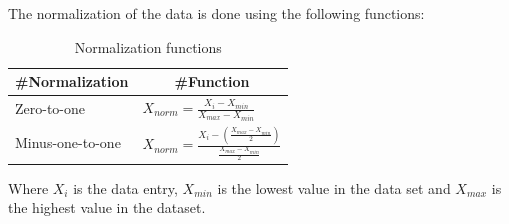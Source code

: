 The normalization of the data is done using the following functions:
\begin{table}[H]
\centering  %
\renewcommand{\arraystretch}{2}
\begin{tabular}{c c} %
 \#Normalization & \#Function \\ [0.5ex] %
\hline                  %
\multicolumn{1}{l}{Zero-to-one} & \multicolumn{1}{l}{$ X_{norm} = \frac{X_i - X_{min}}{X_{max} - X_{min}}$} \\
\multicolumn{1}{l}{Minus-one-to-one} & \multicolumn{1}{l}{$ X_{norm} = \frac{X_i - (\frac{X_{max} - X_{min}}{2})}{\frac{X_{max} - X_{min}}{2}}$} \\
[1ex]
\hline %
\end{tabular}
\caption{Normalization functions} %
\label{table:naiveTrainingApproach} %
\end{table}
Where $X_i$ is the data entry, $X_{min}$ is the lowest value in the data set and $X_{max}$ is the highest value in the dataset.


